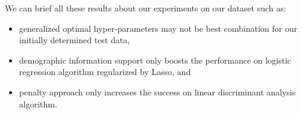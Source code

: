 We can brief all these results about our experiments on our dataset such as:
\begin{itemize}
    \item generalized optimal hyper-parameters may not be best combination for our initially determined test data,
    \item demographic information support only boosts the performance on logistic regression algorithm regularized by Lasso, and
    \item penalty approach only increases the success on linear discriminant analysis algorithm.
\end{itemize}